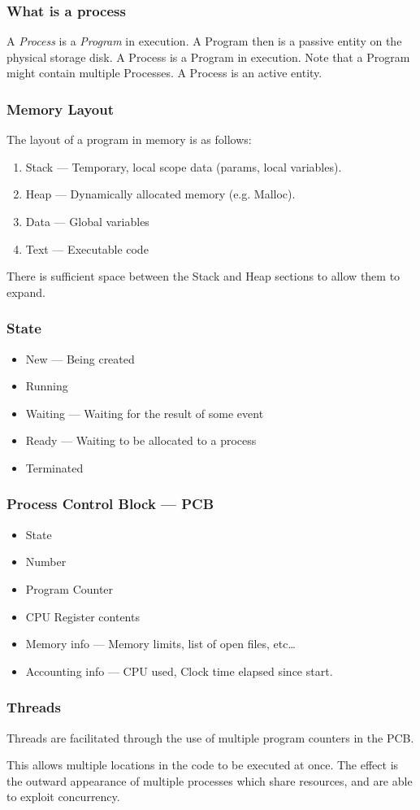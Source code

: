 \subsubsection{What is a process}

A \textit{Process} is a \textit{Program} in execution. A Program then is a passive entity
on the physical storage disk. A Process is a Program in execution. Note that a Program might
contain multiple Processes. A Process is an active entity.


\subsubsection{Memory Layout}

The layout of a program in memory is as follows:

\begin{enumerate}
    \item Stack --- Temporary, local scope data (params, local variables).
    \item Heap --- Dynamically allocated memory (e.g. Malloc).
    \item Data --- Global variables
    \item Text --- Executable code
\end{enumerate}

There is sufficient space between the Stack and Heap sections to allow them to expand.


\subsubsection{State}

\begin{itemize}
    \item New --- Being created
    \item Running
    \item Waiting --- Waiting for the result of some event
    \item Ready --- Waiting to be allocated to a process
    \item Terminated
\end{itemize}


\subsubsection{Process Control Block --- PCB}

\begin{itemize}
    \item State
    \item Number
    \item Program Counter
    \item CPU Register contents
    \item Memory info --- Memory limits, list of open files, etc\ldots
    \item Accounting info --- CPU used, Clock time elapsed since start.
\end{itemize}


\subsubsection{Threads}

Threads are facilitated through the use of multiple program counters in the PCB.

This allows multiple locations in the code to be executed at once.
The effect is the outward appearance of multiple processes which share
resources, and are able to exploit concurrency.